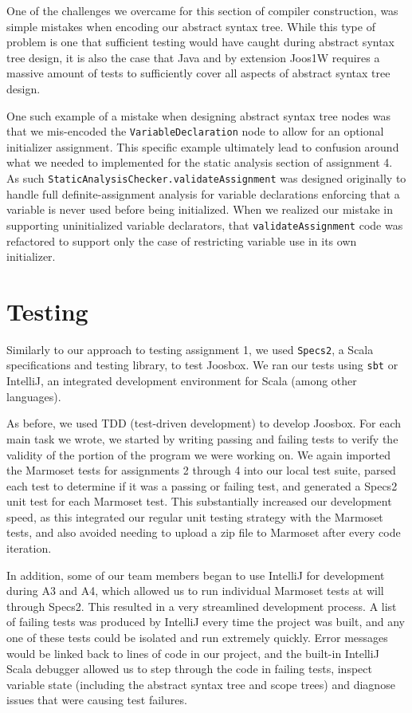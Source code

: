 \documentclass[letterpaper]{article}
\begin{document}
  One of the challenges we overcame for this section of compiler construction,
  was simple mistakes when encoding our abstract syntax tree. While this type of
  problem is one that sufficient testing would have caught during abstract
  syntax tree design, it is also the case that Java and by extension Joos1W
  requires a massive amount of tests to sufficiently cover all aspects of
  abstract syntax tree design.

  One such example of a mistake when designing abstract syntax tree nodes was
  that we mis-encoded the {\tt VariableDeclaration} node to allow for an optional
  initializer assignment. This specific example ultimately lead to confusion
  around what we needed to implemented for the static analysis section of
  assignment 4. As such {\tt StaticAnalysisChecker.validateAssignment}
  was designed originally to handle full definite-assignment analysis for
  variable declarations enforcing that a variable is never used before being
  initialized. When we realized our mistake in supporting uninitialized variable
  declarators, that {\tt validateAssignment} code was refactored to support only
  the case of restricting variable use in its own initializer.

  \section{Testing}

  Similarly to our approach to testing assignment 1, we used {\tt Specs2}, a
  Scala specifications and testing library, to test Joosbox. We ran our tests
  using {\tt sbt} or IntelliJ, an integrated development environment for Scala
  (among other languages).

  As before, we used TDD (test-driven development) to develop Joosbox. For
  each main task we wrote, we started by writing passing and failing tests to
  verify the validity of the portion of the program we were working on. We
  again imported the Marmoset tests for assignments 2 through 4 into our local
  test suite, parsed each test to determine if it was a passing or failing
  test, and generated a Specs2 unit test for each Marmoset test. This
  substantially increased our development speed, as this integrated our
  regular unit testing strategy with the Marmoset tests, and also avoided
  needing to upload a zip file to Marmoset after every code iteration.

  In addition, some of our team members began to use IntelliJ for development
  during A3 and A4, which allowed us to run individual Marmoset tests at will
  through Specs2. This resulted in a very streamlined development process. A
  list of failing tests was produced by IntelliJ every time the project was
  built, and any one of these tests could be isolated and run extremely
  quickly. Error messages would be linked back to lines of code in our
  project, and the built-in IntelliJ Scala debugger allowed us to step through
  the code in failing tests, inspect variable state (including the abstract
  syntax tree and scope trees) and diagnose issues that were causing test
  failures.
\end{document}
